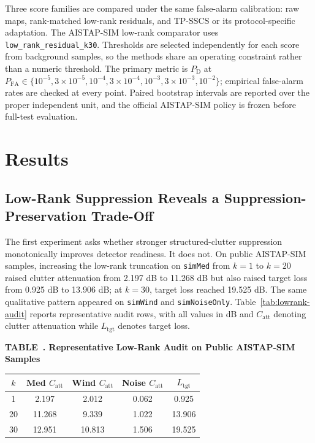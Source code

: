 \documentclass[journal]{IEEEtran}
\newcommand{\SingleColumnTableBlock}[3]{%
  \par\vspace{0.18em}
  \par\noindent\begin{minipage}{\columnwidth}
  \centering
  \refstepcounter{table}\label{#1}%
  {\footnotesize\textbf{TABLE~\thetable. #2}}\\[0.50em]
  #3%
  \end{minipage}
  \par\vspace{0.60em}
}
\begin{document}
Three score families are compared under the same false-alarm calibration: raw maps, rank-matched low-rank residuals, and TP-SSCS or its protocol-specific adaptation. The AISTAP-SIM low-rank comparator uses \texttt{low\_rank\_residual\_k30}. Thresholds are selected independently for each score from background samples, so the methods share an operating constraint rather than a numeric threshold. The primary metric is $P_{\mathrm{D}}$ at $P_{\mathrm{FA}}\in\{10^{-5},3\times10^{-5},10^{-4},3\times10^{-4},10^{-3},3\times10^{-3},10^{-2}\}$; empirical false-alarm rates are checked at every point. Paired bootstrap intervals are reported over the proper independent unit, and the official AISTAP-SIM policy is frozen before full-test evaluation.

\vspace{-1.15\baselineskip}
\section{Results}

\subsection{Low-Rank Suppression Reveals a Suppression-Preservation Trade-Off}

The first experiment asks whether stronger structured-clutter suppression monotonically improves detector readiness. It does not. On public AISTAP-SIM samples, increasing the low-rank truncation on \texttt{simMed} from $k=1$ to $k=20$ raised clutter attenuation from 2.197 dB to 11.268 dB but also raised target loss from 0.925 dB to 13.906 dB; at $k=30$, target loss reached 19.525 dB. The same qualitative pattern appeared on \texttt{simWind} and \texttt{simNoiseOnly}. Table~\ref{tab:lowrank-audit} reports representative audit rows, with all values in dB and $C_{\mathrm{att}}$ denoting clutter attenuation while $L_{\mathrm{tgt}}$ denotes target loss.

\SingleColumnTableBlock{tab:lowrank-audit}{Representative Low-Rank Audit on Public AISTAP-SIM Samples}
{{\scriptsize
\setlength{\tabcolsep}{3.0pt}
\renewcommand{\arraystretch}{1.04}
\begin{tabular}{@{}ccccc@{}}
\toprule
$k$ & Med $C_{\mathrm{att}}$ & Wind $C_{\mathrm{att}}$ & Noise $C_{\mathrm{att}}$ & $L_{\mathrm{tgt}}$ \\
\midrule
1  & 2.197  & 2.012  & 0.062 & 0.925  \\
20 & 11.268 & 9.339  & 1.022 & 13.906 \\
30 & 12.951 & 10.813 & 1.506 & 19.525 \\
\bottomrule
\end{tabular}}
}
\end{document}
